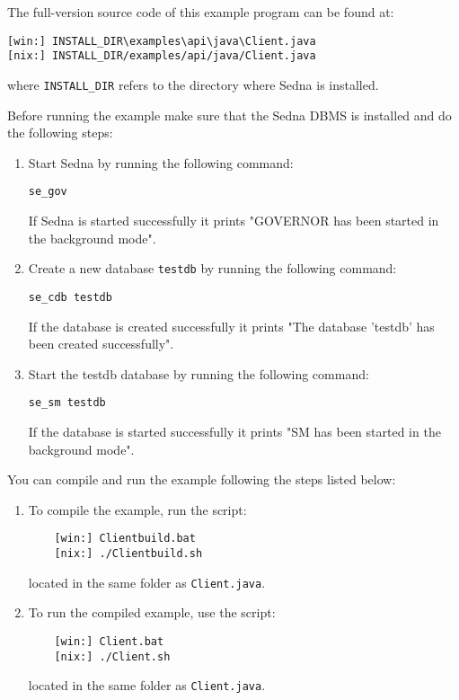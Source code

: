 \documentclass[a4paper,12pt]{article}
\begin{document}
The full-version source code of this example program can be found at:
\begin{verbatim}
[win:] INSTALL_DIR\examples\api\java\Client.java
[nix:] INSTALL_DIR/examples/api/java/Client.java
\end{verbatim}
where \verb!INSTALL_DIR! refers to the directory where Sedna is installed.

Before running the example make sure that the Sedna DBMS is installed and do the
following steps:

\begin{enumerate}
\item Start Sedna by running the following command:
\begin{verbatim}
se_gov
\end{verbatim}
If Sedna is started successfully it prints "GOVERNOR has been started in
the background mode".
\item Create a new database \verb!testdb! by running the following command:
\begin{verbatim}
se_cdb testdb
\end{verbatim}
If the database is created successfully it prints "The database 'testdb' has
been created successfully".
\item Start the testdb database by running the following command:
\begin{verbatim}
se_sm testdb
\end{verbatim}
If the database is started successfully it prints "SM has been started in
the background mode".
\end{enumerate}

You can compile and run the example following the steps listed below:

\begin{enumerate}
\item To compile the example, run the script:
\begin{verbatim}
    [win:] Clientbuild.bat
    [nix:] ./Clientbuild.sh
\end{verbatim}
located in the same folder as \verb!Client.java!.

\item  To run the compiled example, use the script:
\begin{verbatim}
    [win:] Client.bat
    [nix:] ./Client.sh
\end{verbatim}
located in the same folder as \verb!Client.java!.
\end{enumerate}


\end{document}
